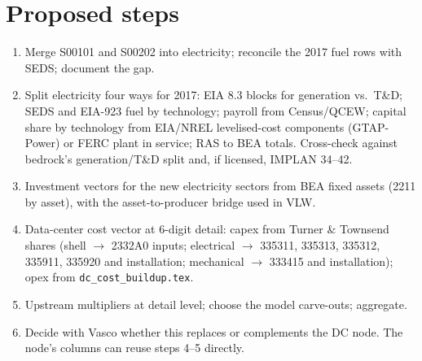 \documentclass[11pt]{article}
\begin{document}
\section{Proposed steps}
\begin{enumerate}
  \item Merge S00101 and S00202 into electricity; reconcile the 2017 fuel rows with SEDS; document the gap.
  \item Split electricity four ways for 2017: EIA 8.3 blocks for generation vs.\ T\&D; SEDS and EIA-923 fuel by technology; payroll from Census/QCEW; capital share by technology from EIA/NREL levelised-cost components (GTAP-Power) or FERC plant in service; RAS to BEA totals. Cross-check against bedrock's generation/T\&D split and, if licensed, IMPLAN 34--42.
  \item Investment vectors for the new electricity sectors from BEA fixed assets (2211 by asset), with the asset-to-producer bridge used in VLW.
  \item Data-center cost vector at 6-digit detail: capex from Turner \& Townsend shares (shell $\to$ 2332A0 inputs; electrical $\to$ 335311, 335313, 335312, 335911, 335920 and installation; mechanical $\to$ 333415 and installation); opex from \texttt{dc\_cost\_buildup.tex}.
  \item Upstream multipliers at detail level; choose the model carve-outs; aggregate.
  \item Decide with Vasco whether this replaces or complements the DC node. The node's columns can reuse steps 4--5 directly.
\end{enumerate}
\end{document}

